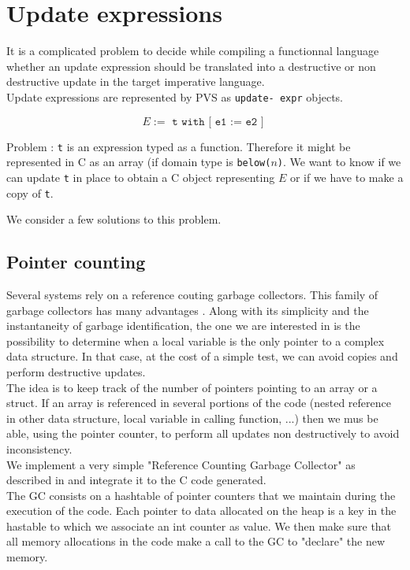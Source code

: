 \documentclass[12pt,a4paper]{article}
\newcommand{\cl}[1]{\texttt{#1}}
\begin{document}
\section{Update expressions}


 It is a complicated problem to decide while compiling a functionnal language whether an update expression should be translated into a destructive or non destructive update in the target imperative language.\\

Update expressions are represented by PVS as \texttt{update-
expr} objects.

$$ E := \texttt{ t with [ e1 := e2 ] } $$

Problem :
\cl{t} is an expression typed as a function. Therefore it might be represented in C as an array (if domain type is \cl{below($n$)}.
We want to know if we can update \cl{t} in place to obtain a C object representing $E$ or if we have to make a copy of \cl{t}.


We consider a few solutions to this problem.


\subsection{Pointer counting}

Several systems rely on a reference couting garbage collectors. This family of garbage collectors has many advantages \cite{jonesgarbage}. Along with its simplicity and the instantaneity of garbage identification, the one we are interested in is the possibility to determine when a local variable is the only pointer to a complex data structure. In that case, at the cost of a simple test, we can avoid copies and perform destructive updates. \\

The idea is to keep track of the number of pointers pointing to an array or a struct. If an array is referenced in several portions of the code (nested reference in other data structure, local variable in calling function, ...) then we mus be able, using the pointer counter, to perform all updates non destructively to avoid inconsistency.\\

We implement a very simple "Reference Counting Garbage Collector" as described in \cite{jonesgarbage} and integrate it to the C code generated.\\

The GC consists on a hashtable of pointer counters that we maintain during the execution of the code. Each pointer to data allocated on the heap is a key in the hastable to which we associate an int counter as value. We then make sure that all memory allocations in the code make a call to the GC to "declare" the new memory.
\end{document}
